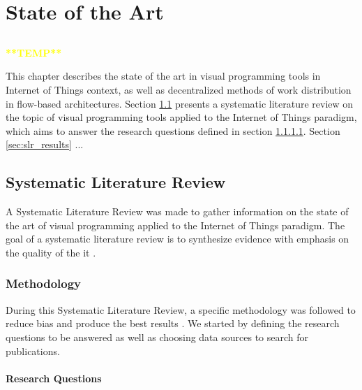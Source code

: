 \chapter{State of the Art}\label{chap:sota}

\section*{}


\textcolor{yellow}{\textbf{**TEMP**}}


This chapter describes the state of the art in visual programming tools in Internet of Things context, as well as decentralized methods of work distribution in flow-based architectures. Section \ref{sec:slr} presents a systematic literature review on the topic of visual programming tools applied to the Internet of Things paradigm, which aims to answer the research questions defined in section \ref{sec:research_questions}. Section \ref{sec:slr_results} ...

\section{Systematic Literature Review}\label{sec:slr}

A Systematic Literature Review was made to gather information on the state of the art of visual programming applied to the Internet of Things paradigm. The goal of a systematic literature review is to synthesize evidence with emphasis on the quality of the it \cite{SLR_guidelines}.

\subsection{Methodology}\label{sec:methodology}

During this Systematic Literature Review, a specific methodology was followed to reduce bias and produce the best results \cite{SLR_guidelines}.
We started by defining the research questions to be answered as well as choosing data sources to search for publications.

\subsubsection{Research Questions}\label{sec:research_questions}

